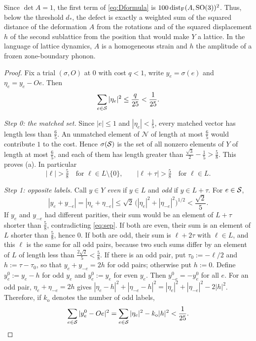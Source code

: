 Since $\det A=1$, the first term of \eqref{eq:Dformula} is $100\operatorname{dist}_\mathrm F(A,\mathrm{SO}(3))^2$. Thus, below the threshold $d_*$, the defect is
exactly a weighted sum of the squared distance of the deformation $A$ from the rotations and of the squared displacement $h$ of the
second sublattice from the position that would make $Y$ a lattice. In the language of lattice dynamics, $A$ is a homogeneous strain
and $h$ the amplitude of a frozen zone-boundary phonon.

\begin{proof}
Fix a trial $(\sigma,O)$ at $0$ with cost $q<1$, write $y_e=\sigma(e)$ and $\eta_e=y_e-Oe$. Then
\begin{equation}\label{eq:etasum}
  \sum_{e\in\mathcal S}|\eta_e|^2\le\frac q{25}<\frac1{25}.
\end{equation}

\emph{Step 0: the matched set.} Since $|e|\le1$ and $|\eta_e|<\frac15$, every matched vector has length less than $\frac65$. An
unmatched element of $\mathcal N$ of length at most $\frac65$ would contribute $1$ to the cost. Hence $\sigma(\mathcal S)$ is the set of
all nonzero elements of $Y$ of length at most $\frac65$, and each of them has length greater than $\frac{\sqrt3}2-\frac15>\frac58$. This
proves (a). In particular
\begin{equation}\label{eq:sep}
  |\ell|>\tfrac58\quad\text{for }\ell\in L\setminus\{0\},\qquad |\ell+\tau|>\tfrac58\quad\text{for }\ell\in L .
\end{equation}

\emph{Step 1: opposite labels.} Call $y\in Y$ \emph{even} if $y\in L$ and \emph{odd} if $y\in L+\tau$. For $e\in\mathcal S$,
\[
  |y_e+y_{-e}|=|\eta_e+\eta_{-e}|\le\sqrt2\,\bigl(|\eta_e|^2+|\eta_{-e}|^2\bigr)^{1/2}<\frac{\sqrt2}5 .
\]
If $y_e$ and $y_{-e}$ had different parities, their sum would be an element of $L+\tau$ shorter than $\frac58$, contradicting
\eqref{eq:sep}. If both are even, their sum is an element of $L$ shorter than $\frac58$, hence $0$. If both are odd, their sum is
$\ell+2\tau$ with $\ell\in L$, and this $\ell$ is the same for all odd pairs, because two such sums differ by an element of $L$ of
length less than $\frac{2\sqrt2}5<\frac58$. If there is an odd pair, put $\tau_0:=-\ell/2$ and $h:=\tau-\tau_0$, so that
$y_e+y_{-e}=2h$ for odd pairs; otherwise put $h:=0$. Define $y^0_e:=y_e-h$ for odd $y_e$ and $y^0_e:=y_e$ for even $y_e$. Then
$y^0_{-e}=-y^0_e$ for all $e$. For an odd pair, $\eta_e+\eta_{-e}=2h$ gives
$|\eta_e-h|^2+|\eta_{-e}-h|^2=|\eta_e|^2+|\eta_{-e}|^2-2|h|^2$. Therefore, if $k_{\mathrm o}$ denotes the number of odd labels,
\begin{equation}\label{eq:centered}
  \sum_{e\in\mathcal S}|y^0_e-Oe|^2=\sum_{e\in\mathcal S}|\eta_e|^2-k_{\mathrm o}|h|^2<\frac1{25}.
\end{equation}


\end{proof}
